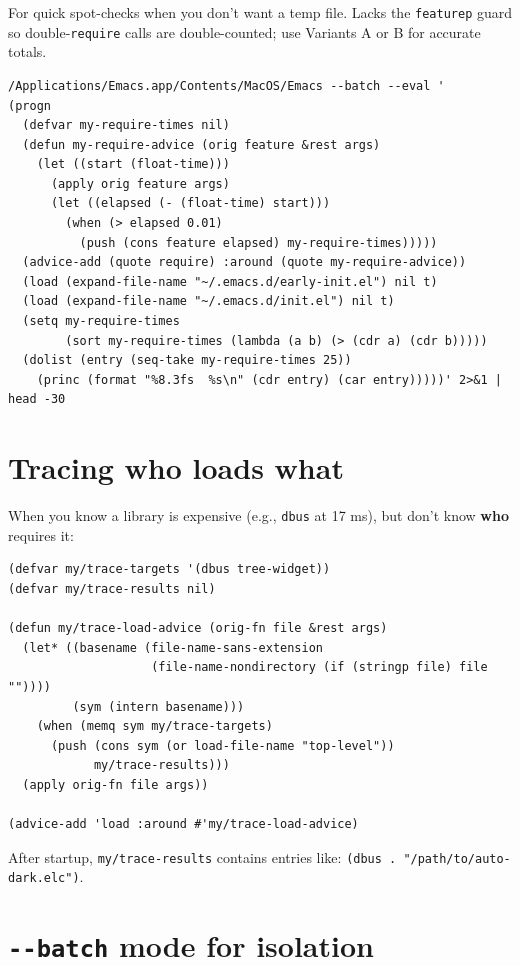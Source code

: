 \begin{expertdepth}
For quick spot-checks when you don't want a temp file. Lacks the \texttt{featurep} guard so double-\texttt{require} calls are double-counted; use Variants A or B for accurate totals.

\begin{verbatim}
/Applications/Emacs.app/Contents/MacOS/Emacs --batch --eval '
(progn
  (defvar my-require-times nil)
  (defun my-require-advice (orig feature &rest args)
    (let ((start (float-time)))
      (apply orig feature args)
      (let ((elapsed (- (float-time) start)))
        (when (> elapsed 0.01)
          (push (cons feature elapsed) my-require-times)))))
  (advice-add (quote require) :around (quote my-require-advice))
  (load (expand-file-name "~/.emacs.d/early-init.el") nil t)
  (load (expand-file-name "~/.emacs.d/init.el") nil t)
  (setq my-require-times
        (sort my-require-times (lambda (a b) (> (cdr a) (cdr b)))))
  (dolist (entry (seq-take my-require-times 25))
    (princ (format "%8.3fs  %s\n" (cdr entry) (car entry)))))' 2>&1 | head -30
\end{verbatim}

\end{expertdepth}

\section{Tracing who loads what}\label{tracing-who-loads-what}

When you know a library is expensive (e.g., \texttt{dbus} at 17 ms), but don't know \textbf{who} requires it:

\begin{verbatim}
(defvar my/trace-targets '(dbus tree-widget))
(defvar my/trace-results nil)

(defun my/trace-load-advice (orig-fn file &rest args)
  (let* ((basename (file-name-sans-extension
                    (file-name-nondirectory (if (stringp file) file ""))))
         (sym (intern basename)))
    (when (memq sym my/trace-targets)
      (push (cons sym (or load-file-name "top-level"))
            my/trace-results)))
  (apply orig-fn file args))

(advice-add 'load :around #'my/trace-load-advice)
\end{verbatim}

After startup, \texttt{my/trace-results} contains entries like: \texttt{(dbus . "/path/to/auto-dark.elc")}.

\section{\texttt{-\/-batch} mode for isolation}\label{batch-mode-for-isolation}

